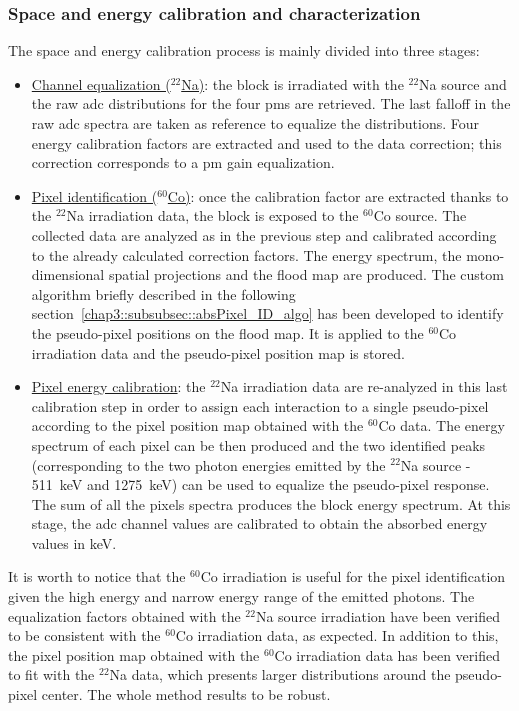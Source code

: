 \subsubsection{Space and energy calibration and characterization}\label{chap3::subsubsec::absSpaceEnMethod}

The space and energy calibration process is mainly divided into three stages:
\begin{itemize}
\item \underline{Channel equalization ($^{22}$Na)}: the block is irradiated with the $^{22}$Na source and the raw \gls{adc} distributions for the four \glspl{pm} are retrieved. The last falloff in the raw \gls{adc} spectra are taken as reference to equalize the distributions. Four energy calibration factors are extracted and used to the data correction; this correction corresponds to a \gls{pm} gain equalization.

\item \underline{Pixel identification ($^{60}$Co)}: once the calibration factor are extracted thanks to the $^{22}$Na irradiation data, the block is exposed to the $^{60}$Co source. The collected data are analyzed as in the previous step and calibrated according to the already calculated correction factors. The energy spectrum, the mono-dimensional spatial projections and the flood map are produced. The custom algorithm briefly described in the following section~\ref{chap3::subsubsec::absPixel_ID_algo} has been developed to identify the pseudo-pixel positions on the flood map. It is applied to the $^{60}$Co irradiation data and the pseudo-pixel position map is stored. 

\item \underline{Pixel energy calibration}: the $^{22}$Na irradiation data are re-analyzed in this last calibration step in order to assign each interaction to a single pseudo-pixel according to the pixel position map obtained with the $^{60}$Co data. The energy spectrum of each pixel can be then produced and the two identified peaks (corresponding to the two photon energies emitted by the $^{22}$Na source - 511~keV and 1275~keV) can be used to equalize the pseudo-pixel response. The sum of all the pixels spectra produces the block energy spectrum. At this stage, the \gls{adc} channel values are calibrated to obtain the absorbed energy values in keV.     
\end{itemize}

It is worth to notice that the $^{60}$Co irradiation is useful for the pixel identification given the high energy and narrow energy range of the emitted photons. The equalization factors obtained with the $^{22}$Na source irradiation have been verified to be consistent with the $^{60}$Co irradiation data, as expected. In addition to this, the pixel position map obtained with the $^{60}$Co irradiation data has been verified to fit with the $^{22}$Na data, which presents larger distributions around the pseudo-pixel center. The whole method results to be robust.

